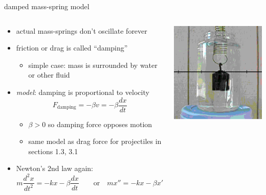 \documentclass[urlcolor=blue,dvipsnames]{beamer}
\begin{document}
\begin{frame}{damped mass-spring model}

\begin{columns}
\begin{column}{0.7\textwidth}
\begin{itemize}
\small
\item actual mass-springs don't oscillate forever
\item friction or drag is called ``damping''
    \begin{itemize}
    \item simple case: mass is surrounded by water or other fluid
    \end{itemize}
\item \emph{model}: damping is proportional to velocity
$$F_{\text{damping}} = - \beta v = - \beta \frac{dx}{dt}$$

\vspace{-2mm}
    \begin{itemize}
    \item $\beta > 0$ so damping force opposes motion
    \item same model as drag force for projectiles in sections 1.3, 3.1
    \end{itemize}
\item Newton's 2nd law again:
    $$\boxed{m \frac{d^2x}{dt^2} = - k x - \beta \frac{dx}{dt}} \qquad \text{or} \quad m x'' = -kx -\beta x'$$
\end{itemize}
\end{column}
\begin{column}{0.3\textwidth}
\includegraphics[width=1.1\textwidth]{figs/dampedmassspring}


\end{column}
\end{columns}
\end{frame}
\end{document}
